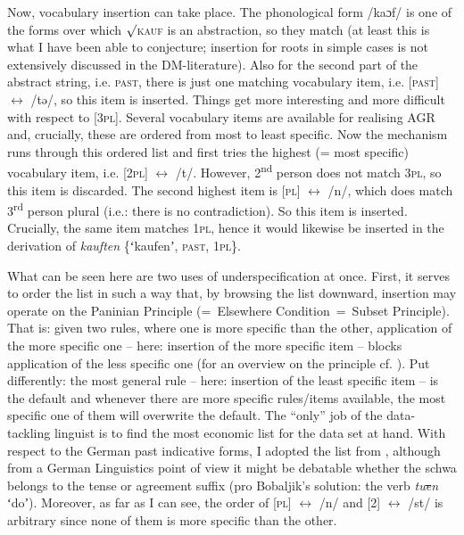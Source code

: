 \documentclass[output=paper]{langsci/langscibook}
\begin{document}
Now, vocabulary insertion can take place. The phonological form /kaɔf/ is one of the forms over which ${\surd}$\textsc{kauf} is an abstraction, so they match (at least this is what I have been able to conjecture; insertion for roots in simple cases is not extensively discussed in the DM-literature). Also for the second part of the abstract string, i.e. \textsc{past}, there is just one matching vocabulary item, i.e. [\textsc{past}] $\leftrightarrow $ /tə/, so this item is inserted. Things get more interesting and more difficult with respect to [3\textsc{pl}]. Several vocabulary items are available for realising AGR and, crucially, these are ordered from most to least specific. Now the mechanism runs through this ordered list and first tries the highest (= most specific) vocabulary item, i.e. [2\textsc{pl}] $\leftrightarrow $ /t/. However, 2\textsuperscript{nd} person does not match 3\textsc{pl}, so this item is discarded. The second highest item is [\textsc{pl}] $\leftrightarrow $ /n/, which does match 3\textsuperscript{rd} person plural (i.e.: there is no contradiction). So this item is inserted. Crucially, the same item matches 1\textsc{pl}, hence it would likewise be inserted in the derivation of \textit{kauften} \{ʻkaufenʼ, \textsc{past}, 1\textsc{pl}\}.

What can be seen here are two uses of underspecification at once. First, it serves to order the list in such a way that, by browsing the list downward, insertion may operate on the Paninian Principle (=~Elsewhere Condition~=~Subset Principle). That is: given two rules, where one is more specific than the other, application of the more specific one – here: insertion of the more specific item – blocks application of the less specific one (for an overview on the principle cf. \citealt[132]{Anderson1992}). Put differently: the most general rule – here: insertion of the least specific item – is the default and whenever there are more specific rules/items available, the most specific one of them will overwrite the default. The “only” job of the data-tackling linguist is to find the most economic list for the data set at hand. With respect to the German past indicative forms, I adopted the list from \citet[6]{Bobaljik2017}, although from a German Linguistics point of view it might be debatable whether the schwa belongs to the tense or agreement suffix (pro Bobaljik’s solution: the verb \textit{tu\sout{e}n} ʻdoʼ). Moreover, as far as I can see, the order of [\textsc{pl}] $\leftrightarrow $ /n/ and [2] $\leftrightarrow $ /st/ is arbitrary since none of them is more specific than the other.
\end{document}
